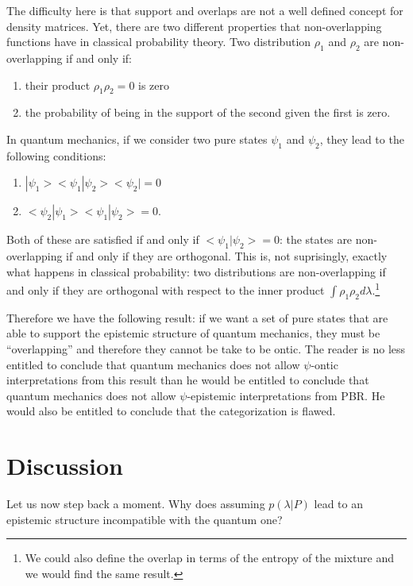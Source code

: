 \documentclass[10pt,twocolumn, nofootinbib]{revtex4-2}
\begin{document}
The difficulty here is that support and overlaps are not a well defined concept for density matrices. Yet, there are two different properties that non-overlapping functions have in classical probability theory. Two distribution $\rho_1$ and $\rho_2$ are non-overlapping if and only if:
\begin{enumerate}
	\item their product $\rho_1 \rho_2 = 0$ is zero
	\item the probability of being in the support of the second given the first is zero.
\end{enumerate}
In quantum mechanics, if we consider two pure states $\psi_1$ and $\psi_2$, they lead to the following conditions:
\begin{enumerate}
	\item $|\psi_1><\psi_1|\psi_2><\psi_2| = 0$
	\item $<\psi_2|\psi_1><\psi_1|\psi_2> = 0$.
\end{enumerate}
Both of these are satisfied if and only if $<\psi_1|\psi_2>=0$: the states are non-overlapping if and only if they are orthogonal. This is, not suprisingly, exactly what happens in classical probability: two distributions are non-overlapping if and only if they are orthogonal with respect to the inner product $\int \rho_1 \rho_2 d\lambda$.\footnote{We could also define the overlap in terms of the entropy of the mixture and we would find the same result.}

Therefore we have the following result: if we want a set of pure states that are able to support the epistemic structure of quantum mechanics, they must be ``overlapping'' and therefore they cannot be take to be ontic. The reader is no less entitled to conclude that quantum mechanics does not allow $\psi$-ontic interpretations from this result than he would be entitled to conclude that quantum mechanics does not allow $\psi$-epistemic interpretations from PBR. He would also be entitled to conclude that the categorization is flawed.



\section{Discussion}

Let us now step back a moment. Why does assuming $p(\lambda|P)$ lead to an epistemic structure incompatible with the quantum one?
\end{document}
